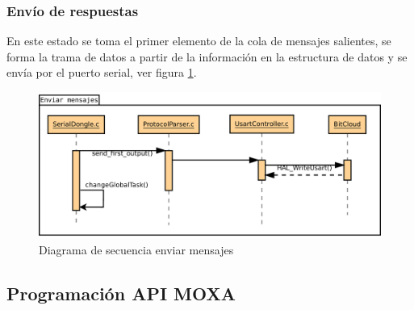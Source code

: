 \subsubsection{Envío de respuestas}

En este estado se toma el primer elemento de la cola de mensajes salientes, se forma la trama de datos a partir de la información en la estructura de datos y se envía por el puerto serial, ver figura \ref{fig:diagrama_enviar_secuencia}. 

\begin{figure}
	\centering
	\includegraphics[scale=0.35]{capitulo_3_imgs/enviar_mensajes_secuencia.pdf}
	\caption{Diagrama de secuencia enviar mensajes}
	\label{fig:diagrama_enviar_secuencia}
\end{figure}


\subsection{Programación API MOXA}